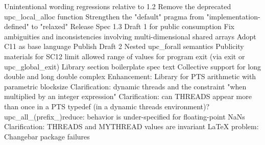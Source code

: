 {      \or %
        Unintentional wording regressions relative to 1.2
      \or %
        Remove the deprecated upc\_local\_alloc function
      \or %
        Strengthen the "default" pragma from "implementation-defined" to "relaxed"
      \or %
        Release Spec 1.3 Draft 1 for public consumption
      \or %
        Fix ambiguities and inconsistencies involving multi-dimensional shared arrays
      \or %
        Adopt C11 as base language
      \or %
        Publish Draft 2
      \or %
        Nested upc\_forall semantics
      \or %
        Publicity materials for SC12
      \or %
        limit allowed range of values for program exit (via exit or upc\_global\_exit)
      \or %
        Library section boilerplate spec text
      \or %
        Collective support for long double and long double complex
      \or %
        Enhancement: Library for PTS arithmetic with parametric blocksize
      \or %
        Clarification: dynamic threads and the constraint "when multiplied by an integer expression"
      \or %
        Clarification: can THREADS appear more than once in a PTS typedef (in a dynamic threads environment)?
      \or %
        upc\_all\_(prefix\_)reduce: behavior is under-specified for floating-point NaNs
      \or %
        Clarification: THREADS and MYTHREAD values are invariant
      \or %
        LaTeX problem: Changebar package failures
    \else
        \empty
    \fi
}
